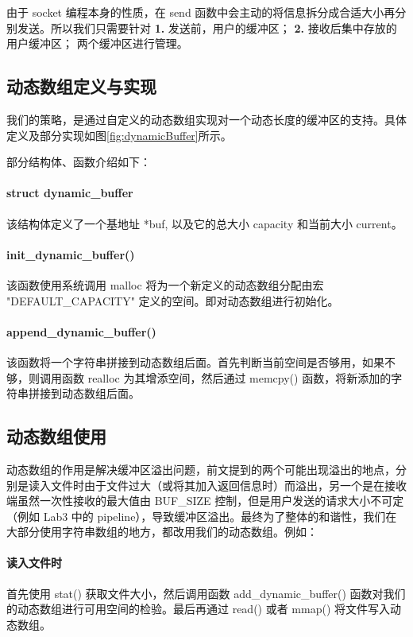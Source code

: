 由于 socket 编程本身的性质，在 send 函数中会主动的将信息拆分成合适大小再分别发送。所以我们只需要针对 \textbf{1.} 发送前，用户的缓冲区； \textbf{2.} 接收后集中存放的用户缓冲区； 两个缓冲区进行管理。

\subsection{动态数组定义与实现}
我们的策略，是通过自定义的动态数组实现对一个动态长度的缓冲区的支持。具体定义及部分实现如图\ref{fig:dynamicBuffer}所示。


部分结构体、函数介绍如下：

\paragraph*{struct dynamic\_buffer} 该结构体定义了一个基地址 *buf, 以及它的总大小 capacity 和当前大小 current。

\paragraph*{init\_dynamic\_buffer()} 该函数使用系统调用 malloc 将为一个新定义的动态数组分配由宏 "DEFAULT\_CAPACITY" 定义的空间。即对动态数组进行初始化。

\paragraph*{append\_dynamic\_buffer()} 该函数将一个字符串拼接到动态数组后面。首先判断当前空间是否够用，如果不够，则调用函数 realloc 为其增添空间，然后通过 memcpy() 函数，将新添加的字符串拼接到动态数组后面。


\subsection{动态数组使用}

动态数组的作用是解决缓冲区溢出问题，前文提到的两个可能出现溢出的地点，分别是读入文件时由于文件过大（或将其加入返回信息时）而溢出，另一个是在接收端虽然一次性接收的最大值由 BUF\_SIZE 控制，但是用户发送的请求大小不可定（例如 Lab3 中的 pipeline），导致缓冲区溢出。最终为了整体的和谐性，我们在大部分使用字符串数组的地方，都改用我们的动态数组。例如：

\paragraph*{读入文件时} 首先使用 stat() 获取文件大小，然后调用函数 add\_dynamic\_buffer() 函数对我们的动态数组进行可用空间的检验。最后再通过 read() 或者 mmap() 将文件写入动态数组。

